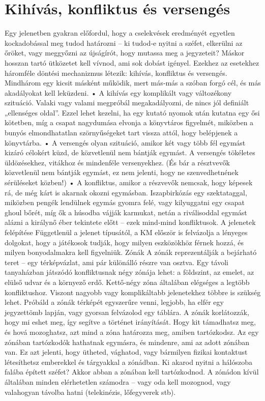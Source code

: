\documentclass[oneside]{book}
\begin{document}
\chapter{Kihívás, konfliktus és versengés}
Egy jelenetben gyakran előfordul, hogy a cselekvések eredményét egyetlen kockadobással meg tudod határozni – ki tudod‑e nyitni a széfet, elkerülni az őröket, vagy meggyőzni az újságírót, hogy mutassa meg a jegyzeteit? Máskor hosszan tartó ütközetet kell vívnod, ami sok dobást igényel. Ezekhez az esetekhez háromféle döntési mechanizmus létezik: kihívás, konfliktus és versengés. Mindhárom egy kicsit másként működik, mert más‑más a szóban forgó cél, és más akadályokat kell leküzdeni.
    • A kihívás egy komplikált vagy változékony szituáció. Valaki vagy valami megpróbál megakadályozni, de nincs jól definiált „ellenséges oldal”. Ezzel lehet kezelni, ha egy kutató nyomok után kutatna egy ősi kötetben, míg a csapat nagydumása elvonja a könyvtáros figyelmét, miközben a bunyós elmondhatatlan szörnyűségeket tart vissza attól, hogy belépjenek a könyvtárba.
    • A versengés olyan szituáció, amikor két vagy több fél egymást kizáró célokért küzd, de közvetlenül nem bántják egymást. A versengés tökéletes üldözésekhez, vitákhoz és mindenféle versenyekhez. (És bár a résztvevők közvetlenül nem bántják egymást, ez nem jelenti, hogy ne szenvedhetnének sérüléseket közben!)
    • A konfliktus, amikor a részvevők nemcsak, hogy képesek rá, de még kárt is akarnak okozni egymásban. Iszapbirkózás egy szektataggal, miközben pengék lendülnek egymás gyomra felé, vagy kilyuggatni egy csapat ghoul bőrét, míg ők a húsodba vájják karmukat, netán a riválisoddal egymást alázni a királynő éber tekintete előtt – ezek mind‑mind konfliktusok.
A jelenetek felépítése
Függetlenül a jelenet típusától, a KM először is felvázolja a lényeges dolgokat, hogy a játékosok tudják, hogy milyen eszközökhöz férnek hozzá, és milyen bonyodalmakra kell figyelniük.
Zónák
A zónák reprezentálják a bejárható teret – egy térképvázlat, ami pár különálló részre van osztva. Egy távoli tanyaházban játszódó konfliktusnak négy zónája lehet: a földszint, az emelet, az elülső udvar és a környező erdő. Kettő‑négy zóna általában elégséges a legtöbb konfliktushoz. Viszont nagyobb vagy komplikáltabb jelenetekhez többre is szükség lehet. Próbáld a zónák térképét egyszerűre venni, legjobb, ha elfér egy jegyzettömb lapján, vagy gyorsan felvázolod egy táblára.
A zónák korlátozzák, hogy mi eshet meg, így segítve a történet irányítását. Hogy kit támadhatsz meg, és hová mozoghatsz, azt mind a zóna határozza meg, amiben tartózkodsz.
Az egy zónában tartózkodók hathatnak egymásra, és mindenre, ami az adott zónában van. Ez azt jelenti, hogy ütheted, vághatod, vagy bármilyen fizikai kontaktust létesíthetsz emberekkel és tárgyakkal a zónádban. Ki akarod nyitni a hálószoba falába épített széfet? Akkor abban a zónában kell tartózkodnod. A zónádon kívül általában minden elérhetetlen számodra – vagy oda kell mozognod, vagy valahogyan távolba hatni (telekinézis, lőfegyverek stb).
\end{document}
